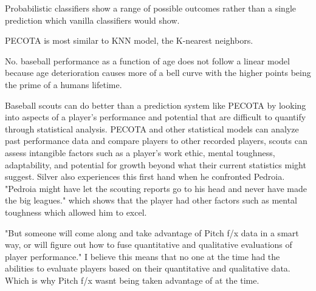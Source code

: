 \documentclass[12pt]{article}
\begin{document}
\begin{enumerate}
Probabilistic classifiers show a range of possible outcomes rather than a single prediction which vanilla classifiers would show. 


PECOTA is most similar to KNN model, the K-nearest neighbors.


No. baseball performance as a function of age does not follow a linear model because age deterioration causes more of a bell curve with the higher points being the prime of a humans lifetime.


Baseball scouts can do better than a prediction system like PECOTA by looking into aspects of a player's performance and potential that are difficult to quantify through statistical analysis. PECOTA and other statistical models can analyze past performance data and compare players to other recorded players, scouts can assess intangible factors such as a player's work ethic, mental toughness, adaptability, and potential for growth beyond what their current statistics might suggest. Silver also experiences this first hand when he confronted Pedroia. "Pedroia
might have let the scouting reports go to his head and never have made the big leagues." which shows that the player had other factors such as mental toughness which allowed him to excel.


"But someone will come along and take advantage of Pitch f/x data in a smart way, or will figure out how to fuse quantitative and qualitative evaluations of player performance." I believe this means that no one at the time had the abilities to evaluate players based on their quantitative and qualitative data. Which is why Pitch f/x wasnt being taken advantage of at the time.

\end{enumerate}



\end{document}
